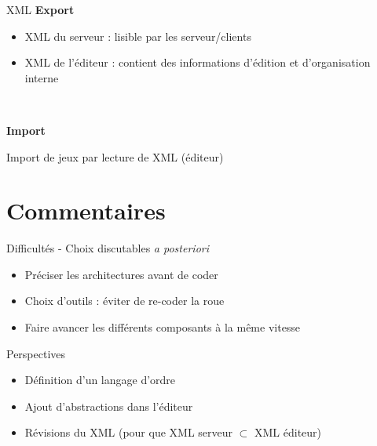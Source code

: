 \documentclass[11pt]{beamer}
\begin{document}
\begin{frame}{XML}
	\textbf{Export}
	\begin{itemize}
		\item XML du serveur : lisible par les serveur/clients
		\item XML de l'éditeur : contient des informations d'édition et d'organisation interne
	\end{itemize}
	
	~
	
	\textbf{Import}
	
	Import de jeux par lecture de XML (éditeur)
\end{frame}


\section{Commentaires}
\begin{frame}{Difficultés - Choix discutables \textit{a posteriori}}
	\begin{itemize}
		\item Préciser les architectures avant de coder
		\item Choix d'outils : éviter de re-coder la roue
		\item Faire avancer les différents composants à la même vitesse
	\end{itemize}
\end{frame}


\begin{frame}{Perspectives}
	\begin{itemize}
		\item Définition d'un langage d'ordre
		\item Ajout d'abstractions dans l'éditeur
		\item Révisions du XML (pour que XML serveur $\subset$ XML éditeur)
	\end{itemize}
\end{frame}
\end{document}
